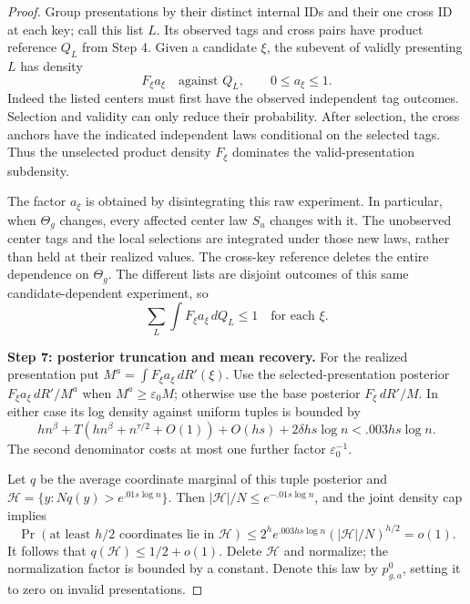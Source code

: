 \begin{proof}
Group presentations by their distinct internal IDs and their one cross ID at each key; call this list \(L\). Its observed tags and cross pairs have product reference \(Q_L\) from Step 4. Given a candidate \(\xi\), the subevent of validly presenting \(L\) has density
\[
 F_\xi a_\xi\quad\text{against }Q_L,\qquad 0\le a_\xi\le1.
\]
Indeed the listed centers must first have the observed independent tag outcomes. Selection and validity can only reduce their probability. After selection, the cross anchors have the indicated independent laws conditional on the selected tags. Thus the unselected product density \(F_\xi\) dominates the valid-presentation subdensity.

The factor \(a_\xi\) is obtained by disintegrating this raw experiment. In particular, when \(\Theta_g\) changes, every affected center law \(S_u\) changes with it. The unobserved center tags and the local selections are integrated under those new laws, rather than held at their realized values. The cross-key reference deletes the entire dependence on \(\Theta_g\). The different lists are disjoint outcomes of this same candidate-dependent experiment, so
\[
 \sum_L\int F_\xi a_\xi\,dQ_L\le1
 \quad\text{for each }\xi.
\]

\noindent\textbf{Step 7: posterior truncation and mean recovery.}\quad
For the realized presentation put
\(M^a=\int F_\xi a_\xi\,dR'(\xi)\).
Use the selected-presentation posterior
\(F_\xi a_\xi\,dR'/M^a\) when \(M^a\ge\varepsilon_0 M\);
otherwise use the base posterior \(F_\xi\,dR'/M\).
In either case its log density against uniform tuples is bounded by
\[
 hn^\beta+T(hn^\beta+n^{\tau/2}+O(1))
       +O(hs)+2\delta hs\log n
 <.003hs\log n.
\]
The second denominator costs at most one further factor \(\varepsilon_0^{-1}\).

Let \(q\) be the average coordinate marginal of this tuple posterior and
\(\mathcal H=\{y:Nq(y)>e^{.01s\log n}\}\).
Then \(|\mathcal H|/N\le e^{-.01s\log n}\), and the joint density cap implies
\[
 \Pr(\text{at least \(h/2\) coordinates lie in }\mathcal H)
 \le 2^h e^{.003hs\log n}(|\mathcal H|/N)^{h/2}
 =o(1).
\]
It follows that \(q(\mathcal H)\le1/2+o(1)\). Delete \(\mathcal H\) and normalize; the normalization factor is bounded by a constant. Denote this law by \(p^0_{g,a}\), setting it to zero on invalid presentations.


\end{proof}
